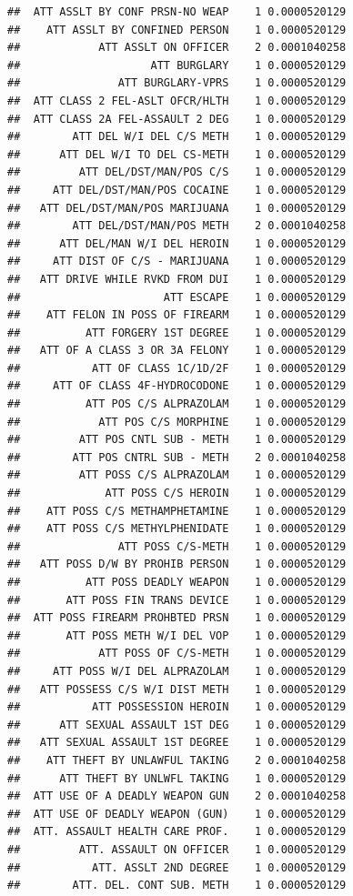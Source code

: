 \documentclass[]{book}
\begin{document}
\begin{verbatim}
##  ATT ASSLT BY CONF PRSN-NO WEAP    1 0.0000520129
##    ATT ASSLT BY CONFINED PERSON    1 0.0000520129
##            ATT ASSLT ON OFFICER    2 0.0001040258
##                    ATT BURGLARY    1 0.0000520129
##               ATT BURGLARY-VPRS    1 0.0000520129
##  ATT CLASS 2 FEL-ASLT OFCR/HLTH    1 0.0000520129
##  ATT CLASS 2A FEL-ASSAULT 2 DEG    1 0.0000520129
##        ATT DEL W/I DEL C/S METH    1 0.0000520129
##      ATT DEL W/I TO DEL CS-METH    1 0.0000520129
##         ATT DEL/DST/MAN/POS C/S    1 0.0000520129
##     ATT DEL/DST/MAN/POS COCAINE    1 0.0000520129
##   ATT DEL/DST/MAN/POS MARIJUANA    1 0.0000520129
##        ATT DEL/DST/MAN/POS METH    2 0.0001040258
##      ATT DEL/MAN W/I DEL HEROIN    1 0.0000520129
##     ATT DIST OF C/S - MARIJUANA    1 0.0000520129
##   ATT DRIVE WHILE RVKD FROM DUI    1 0.0000520129
##                      ATT ESCAPE    1 0.0000520129
##    ATT FELON IN POSS OF FIREARM    1 0.0000520129
##          ATT FORGERY 1ST DEGREE    1 0.0000520129
##   ATT OF A CLASS 3 OR 3A FELONY    1 0.0000520129
##           ATT OF CLASS 1C/1D/2F    1 0.0000520129
##     ATT OF CLASS 4F-HYDROCODONE    1 0.0000520129
##          ATT POS C/S ALPRAZOLAM    1 0.0000520129
##            ATT POS C/S MORPHINE    1 0.0000520129
##         ATT POS CNTL SUB - METH    1 0.0000520129
##        ATT POS CNTRL SUB - METH    2 0.0001040258
##         ATT POSS C/S ALPRAZOLAM    1 0.0000520129
##             ATT POSS C/S HEROIN    1 0.0000520129
##    ATT POSS C/S METHAMPHETAMINE    1 0.0000520129
##    ATT POSS C/S METHYLPHENIDATE    1 0.0000520129
##               ATT POSS C/S-METH    1 0.0000520129
##   ATT POSS D/W BY PROHIB PERSON    1 0.0000520129
##          ATT POSS DEADLY WEAPON    1 0.0000520129
##       ATT POSS FIN TRANS DEVICE    1 0.0000520129
##  ATT POSS FIREARM PROHBTED PRSN    1 0.0000520129
##       ATT POSS METH W/I DEL VOP    1 0.0000520129
##            ATT POSS OF C/S-METH    1 0.0000520129
##     ATT POSS W/I DEL ALPRAZOLAM    1 0.0000520129
##   ATT POSSESS C/S W/I DIST METH    1 0.0000520129
##           ATT POSSESSION HEROIN    1 0.0000520129
##      ATT SEXUAL ASSAULT 1ST DEG    1 0.0000520129
##   ATT SEXUAL ASSAULT 1ST DEGREE    1 0.0000520129
##    ATT THEFT BY UNLAWFUL TAKING    2 0.0001040258
##      ATT THEFT BY UNLWFL TAKING    1 0.0000520129
##  ATT USE OF A DEADLY WEAPON GUN    2 0.0001040258
##  ATT USE OF DEADLY WEAPON (GUN)    1 0.0000520129
##  ATT. ASSAULT HEALTH CARE PROF.    1 0.0000520129
##         ATT. ASSAULT ON OFFICER    1 0.0000520129
##           ATT. ASSLT 2ND DEGREE    1 0.0000520129
##        ATT. DEL. CONT SUB. METH    1 0.0000520129

\end{verbatim}
\end{document}
